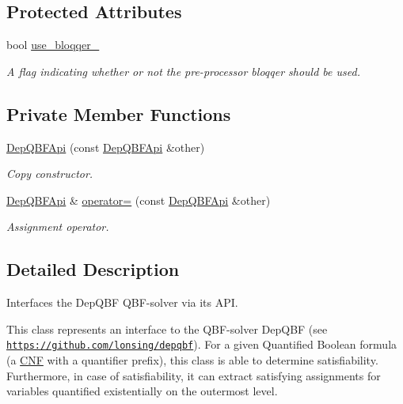 \subsection*{Protected Attributes}
\begin{DoxyCompactItemize}
\item 
bool \hyperlink{classDepQBFApi_a04798225c77a19a1d2f415e50b93cfb1}{use\-\_\-bloqqer\-\_\-}
\begin{DoxyCompactList}\small\item\em A flag indicating whether or not the pre-\/processor bloqqer should be used. \end{DoxyCompactList}\end{DoxyCompactItemize}
\subsection*{Private Member Functions}
\begin{DoxyCompactItemize}
\item 
\hyperlink{classDepQBFApi_ab7f7fe54d8ebfd6dc49296e10efada92}{Dep\-Q\-B\-F\-Api} (const \hyperlink{classDepQBFApi}{Dep\-Q\-B\-F\-Api} \&other)
\begin{DoxyCompactList}\small\item\em Copy constructor. \end{DoxyCompactList}\item 
\hyperlink{classDepQBFApi}{Dep\-Q\-B\-F\-Api} \& \hyperlink{classDepQBFApi_ac92d8d42313774de6ce7f3bb2ca121c0}{operator=} (const \hyperlink{classDepQBFApi}{Dep\-Q\-B\-F\-Api} \&other)
\begin{DoxyCompactList}\small\item\em Assignment operator. \end{DoxyCompactList}\end{DoxyCompactItemize}


\subsection{Detailed Description}
Interfaces the Dep\-Q\-B\-F Q\-B\-F-\/solver via its A\-P\-I. 

This class represents an interface to the Q\-B\-F-\/solver Dep\-Q\-B\-F (see \href{https://github.com/lonsing/depqbf}{\tt https\-://github.\-com/lonsing/depqbf}). For a given Quantified Boolean formula (a \hyperlink{classCNF}{C\-N\-F} with a quantifier prefix), this class is able to determine satisfiability. Furthermore, in case of satisfiability, it can extract satisfying assignments for variables quantified existentially on the outermost level.

